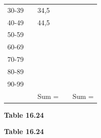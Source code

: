 \begin{description}[noitemsep]
\begin{description}[noitemsep]
\begin{enumerate}[noitemsep, label=\textbf{\arabic*}. ]
\begin{table}
\begin{center}
\begin{xtabular}[t]{|l|l|l|l|l|}
     \tabularnewline{}
        30-39 &
         &
        34,5 &
         &
     \tabularnewline{}
        40-49 &
         &
        44,5 &
         &
     \tabularnewline{}
        50-59 &
         &
         &
         &
     \tabularnewline{}
        60-69 &
         &
         &
         &
     \tabularnewline{}
        70-79 &
         &
         &
         &
     \tabularnewline{}
        80-89 &
         &
         &
         &
     \tabularnewline{}
        90-99 &
         &
         &
         &
     \tabularnewline{}
         &
         &
        Sum = &
         &
        Sum =%
     \tabularnewline{}
    \end{xtabular}
      \end{center}
    \begin{center}{\small\bfseries Table 16.24}\end{center}
    \begin{caption}{\small\bfseries Table 16.24}\end{caption}
\end{table}
    \par
  \par         \end{enumerate}

\end{description}
\end{description}
